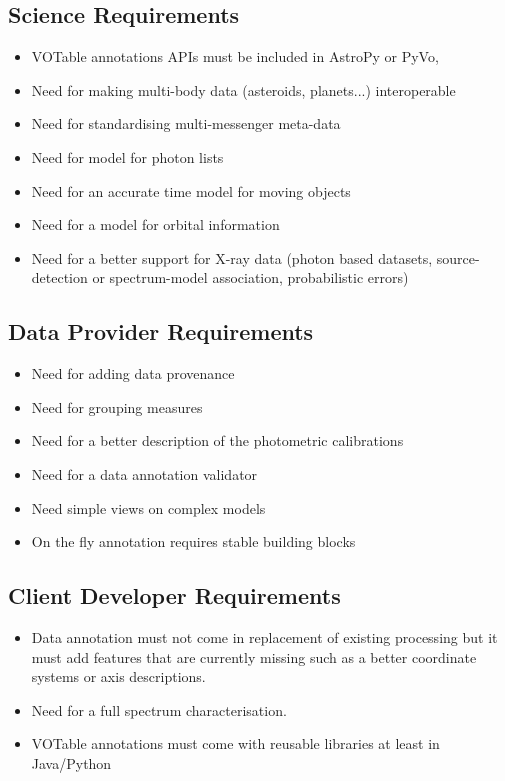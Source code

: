 \documentclass[11pt,a4paper]{ivoa}
\begin{document}
\subsection{Science Requirements}

\begin{itemize}
\item VOTable annotations APIs must be included in AstroPy or PyVo,
\item Need for making multi-body data (asteroids, planets...) interoperable
\item Need for standardising multi-messenger meta-data
\item Need for model for photon lists
\item Need for an accurate time model for moving objects
\item Need for a model for orbital information
\item Need for a better support for X-ray data (photon based datasets, source-detection or spectrum-model association, probabilistic errors)
\end{itemize}

\subsection{Data Provider Requirements}

\begin{itemize}
\item Need for adding data provenance
\item Need for grouping measures
\item Need for a better description of the photometric calibrations
\item Need for a data annotation validator
\item Need simple views on complex models
\item On the fly annotation requires stable building blocks
\end{itemize}

\subsection{Client Developer Requirements}

\begin{itemize}
\item Data annotation must not come in replacement of existing processing but it must 
         add features that are currently missing such as a better coordinate systems or axis descriptions.
\item Need for a full spectrum characterisation.
\item VOTable annotations must come with reusable libraries at least in Java/Python
\end{itemize}
 
\end{document}

